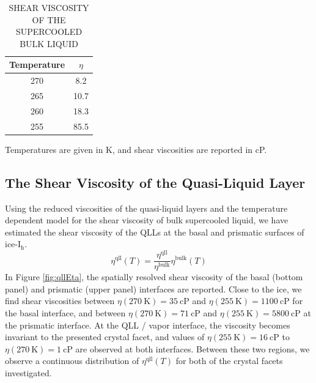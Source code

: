 \begin{table}[h] \centering \caption{SHEAR VISCOSITY OF THE
    SUPERCOOLED BULK LIQUID\label{tab:bulkVisco}}
\begin{tabular}{cc}
\hline
\hline
 Temperature & $\eta$ \\
\hline
270 & 8.2 \\
265 & 10.7 \\
260 & 18.3  \\
255 & 85.5 \\
\hline
\hline
\end{tabular}
\begin{flushleft}
  Temperatures are given in K, and shear viscosities are reported in
  cP.
\end{flushleft}
\end{table}


\subsection{The Shear Viscosity of the Quasi-Liquid Layer}
Using the reduced viscosities of the quasi-liquid layers and the
temperature dependent model for the shear viscosity of bulk
supercooled liquid, we have estimated the shear viscosity of the QLLs
at the basal and prismatic surfaces of ice-I$_\mathrm{h}$.
\begin{equation}\label{eq:qllT}
\eta^{\mathrm{qll}}(T) = \frac{\eta^{\mathrm{qll}}}{\eta^{\mathrm{bulk}}}\eta^{\mathrm{bulk}}(T)
\end{equation}
In Figure \ref{fig:qllEta}, the spatially resolved shear viscosity of
the basal (bottom panel) and prismatic (upper panel) interfaces are
reported. Close to the ice, we find shear viscosities between
$\eta(270~\mathrm{K}) = 35~\mathrm{cP}$ and
$\eta(255~\mathrm{K}) = 1100~\mathrm{cP}$ for the basal interface, and
between $\eta(270~\mathrm{K}) = 71~\mathrm{cP}$ and
$\eta(255~\mathrm{K}) = 5800~\mathrm{cP}$ at the prismatic
interface. At the QLL / vapor interface, the viscosity becomes
invariant to the presented crystal facet, and values of
$\eta(255~\mathrm{K}) = 16~\mathrm{cP}$ to
$\eta(270~\mathrm{K}) = 1~\mathrm{cP}$ are observed at both
interfaces. Between these two regions, we observe a continuous
distribution of $\eta^{\mathrm{qll}}(T)$ for both of the crystal
facets investigated. 

